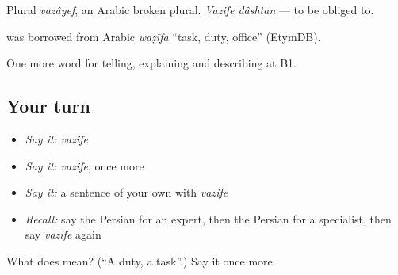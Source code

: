 Plural \emph{vazâyef}, an Arabic broken plural. \emph{Vazife dâshtan} — to be obliged to.

\begin{cousinweb}
\textbf{} was borrowed from Arabic \emph{waẓīfa} \textquotedblleft{}task, duty, office\textquotedblright{} (EtymDB).
\end{cousinweb}

\begin{grammarlens}[title={What you've built}]
One more word for telling, explaining and describing at B1.
\end{grammarlens}

\subsection*{Your turn}
\begin{itemize}
\raggedright
  \item \emph{Say it:} \emph{vazife}
  \item \emph{Say it:} \emph{vazife}, once more
  \item \emph{Say it:} a sentence of your own with \emph{vazife}
  \item \emph{Recall:} say the Persian for an expert, then the Persian for a specialist, then say \emph{vazife} again
\end{itemize}

\begin{tcolorbox}[breakable,colback=teal!4,colframe=teal!35!black,title={Before you move on}]
What does  mean? (\textquotedblleft{}A duty, a task\textquotedblright{}.) Say it once more.
\end{tcolorbox}
